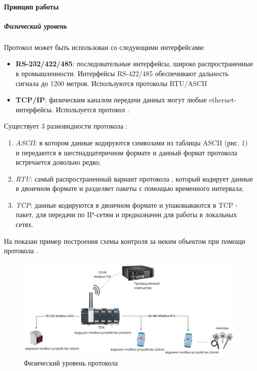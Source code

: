 \paragraph{Принцип работы}
\subparagraph{Физический уровень}
Протокол \mb может быть использован со следующими интерфейсами:
\begin{itemize}
	\item \textbf{RS-232/422/485}:  последовательные интерфейсы, широко распространенные в промышленности. Интерфейсы RS-422/485 обеспечивают дальность сигнала до 1200 метров. Используются протоколы \mb RTU/ASCII
	\item \textbf{TCP/IP}: физическим каналом передачи данных могут любые ethernet-ин\-терфейсы. Используется протокол \mb \tcp.
\end{itemize}
Существует 3 разновидности протокола \mb{} \cite{_modbus_2021}:
\begin{enumerate}
	\item \mb{} \textit{ASCII}: в котором данные кодируются символами из таблицы ASCII (рис. 1) и передаются в шестнадцатеричном формате и данный формат протокола встречается довольно редко;
	\item \mb{} \textit{RTU}: самый распространенный вариант протокола \mb, который кодирует данные в двоичном формате и разделяет пакеты с помощью временного интервала;
	\item \mb{} \textit{TCP}:  данные кодируются в двоичном формате и упаковываются в TCP - пакет, для передачи по IP-сетям и предназначен для работы в локальных сетях.
\end{enumerate}

На  показан пример построения схемы контроля за неким объектом при помощи протокола \mb{} \cite{advantech__2019}.

\begin{figure}[p]
	\centering
	\includegraphics[width=0.9\linewidth]{images/modbus_phys}
	\caption{Физический уровень протокола \mb{}}
	\label{fig:modbusphys}
\end{figure}

